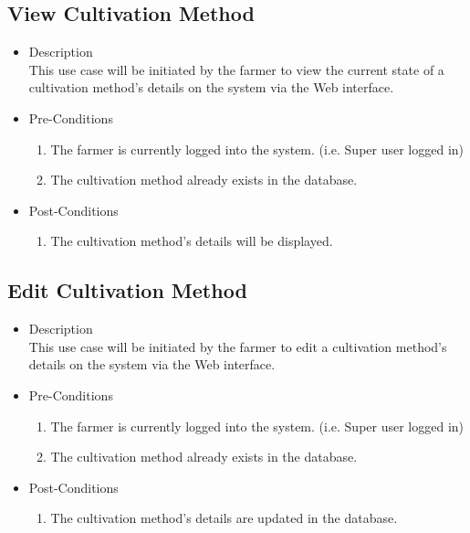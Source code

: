 \documentclass[11pt,fleqn]{book} %
\begin{document}
	\subsection{View Cultivation Method}
	\begin{itemize}
		\item Description\\
		This use case will be initiated by the farmer to view the current state of a cultivation method’s details on the system via the Web interface.
		\item Pre-Conditions
		\begin{enumerate}
			\item The farmer is currently logged into the system. (i.e. Super user logged in)
			\item The cultivation method already exists in the database.		
		\end{enumerate}
		\item Post-Conditions
		\begin{enumerate}
			\item The cultivation method’s details will be displayed.
		\end{enumerate}
	\end{itemize}
	
	\subsection{Edit Cultivation Method}
	\begin{itemize}
		\item Description\\
		This use case will be initiated by the farmer to edit a cultivation method’s details on the system via the Web interface.
		\item Pre-Conditions
		\begin{enumerate}
			\item The farmer is currently logged into the system. (i.e. Super user logged in)
			\item The cultivation method already exists in the database.					
		\end{enumerate}
		\item Post-Conditions
		\begin{enumerate}
			\item The cultivation method’s details are updated in the database.
		\end{enumerate}
	\end{itemize}
	
\end{document}
